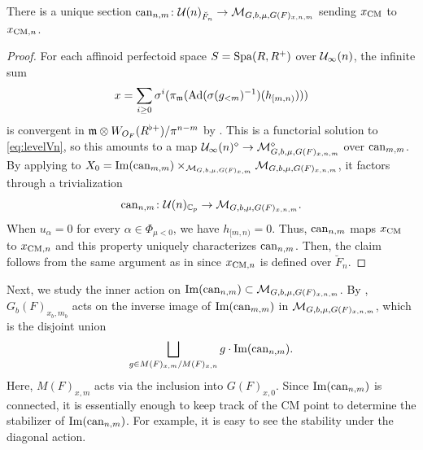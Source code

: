 \documentclass[12pt,reqno]{amsart}
\begin{document}
\begin{thm} \label{thm:refined_trivialization}
    There is a unique section 
    $
        {\operatorname{can}}_{n, m} \colon {\mathcal{U}}(n)_{\breve{F}_n} \to {\mathcal{M}}_{G, b, \mu, G(F)_{x, n, m}}
    $
    sending $x_{\operatorname{CM}}$ to $x_{{\operatorname{CM}}, n}$. 
\end{thm}
\begin{proof}
    For each affinoid perfectoid space $S = {\operatorname{Spa}}(R,R^+)$ over ${\mathcal{U}}_\infty(n)$, the infinite sum
    \[
        x = \sum_{i \geq 0} \sigma^i(\pi_{{\mathfrak{m}}}({\operatorname{Ad}}(\sigma(g_{<m})^{-1})(h_{[m, n)})))
    \]
    is convergent in ${\mathfrak{m}} \otimes W_{O_F}(R^{\flat +})/\pi^{n - m}$ by . This is a functorial solution to \eqref{eq:levelVn}, so this amounts to a map ${\mathcal{U}}_\infty(n)^\diamond \to {\mathcal{M}}_{G, b, \mu, G(F)_{x, n, m}}^\diamond$ over ${\operatorname{can}}_{m, m}$. By applying  to $X_0 = {\operatorname{Im}}({\operatorname{can}}_{m, m}) \times_{{\mathcal{M}}_{G, b, \mu, G(F)_{x, m}}} {\mathcal{M}}_{G, b, \mu, G(F)_{x, n, m}}$, it factors through a trivialization 
    \[
        {\operatorname{can}}_{n, m}\colon {\mathcal{U}}(n)_{\mathbb{C}_p} \to {\mathcal{M}}_{G, b, \mu, G(F)_{x, n, m}}. 
    \]
    When $u_{\alpha} = 0$ for every $\alpha \in \Phi_{\mu < 0}$, we have $h_{[m, n)} = 0$. Thus, ${\operatorname{can}}_{n, m}$ maps $x_{\operatorname{CM}}$ to $x_{{\operatorname{CM}}, n}$ and this property uniquely characterizes ${\operatorname{can}}_{n, m}$. Then, the claim follows from the same argument as in  since $x_{{\operatorname{CM}}, n}$ is defined over $\breve{F}_n$. 
\end{proof}

Next, we study the inner action on ${\operatorname{Im}}({\operatorname{can}}_{n, m}) \subset {\mathcal{M}}_{G, b, \mu, G(F)_{x, n, m}}$. By , $G_b(F)_{x_b, m_b}$ acts on the inverse image of ${\operatorname{Im}}({\operatorname{can}}_{m, m})$ in ${\mathcal{M}}_{G, b, \mu, G(F)_{x, n, m}}$, which is the disjoint union 
\begin{equation} \label{eq:inverse_image_U(n)}
    \bigsqcup_{g \in M(F)_{x, m} / M(F)_{x, n}} g \cdot {\operatorname{Im}}({\operatorname{can}}_{n, m}).
\end{equation}
Here, $M(F)_{x, m}$ acts via the inclusion into $G(F)_{x, 0}$. Since ${\operatorname{Im}}({\operatorname{can}}_{n, m})$ is connected, it is essentially enough to keep track of the CM point to determine the stabilizer of ${\operatorname{Im}}({\operatorname{can}}_{n, m})$. For example, it is easy to see the stability under the diagonal action. 
\end{document}
